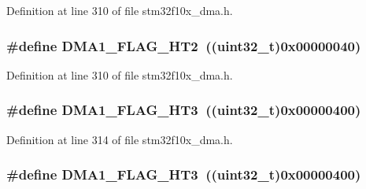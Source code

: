 Definition at line 310 of file stm32f10x\+\_\+dma.\+h.

\subsubsection[{\texorpdfstring{D\+M\+A1\+\_\+\+F\+L\+A\+G\+\_\+\+H\+T2}{DMA1_FLAG_HT2}}]{\setlength{\rightskip}{0pt plus 5cm}\#define D\+M\+A1\+\_\+\+F\+L\+A\+G\+\_\+\+H\+T2~(({\bf uint32\+\_\+t})0x00000040)}\hypertarget{group___d_m_a__flags__definition_gae154ffd90ebaec11f9ed1be00e69f149}{}\label{group___d_m_a__flags__definition_gae154ffd90ebaec11f9ed1be00e69f149}


Definition at line 310 of file stm32f10x\+\_\+dma.\+h.

\subsubsection[{\texorpdfstring{D\+M\+A1\+\_\+\+F\+L\+A\+G\+\_\+\+H\+T3}{DMA1_FLAG_HT3}}]{\setlength{\rightskip}{0pt plus 5cm}\#define D\+M\+A1\+\_\+\+F\+L\+A\+G\+\_\+\+H\+T3~(({\bf uint32\+\_\+t})0x00000400)}\hypertarget{group___d_m_a__flags__definition_ga9c801c1702fcc41b74bb7397ce80a8fc}{}\label{group___d_m_a__flags__definition_ga9c801c1702fcc41b74bb7397ce80a8fc}


Definition at line 314 of file stm32f10x\+\_\+dma.\+h.

\subsubsection[{\texorpdfstring{D\+M\+A1\+\_\+\+F\+L\+A\+G\+\_\+\+H\+T3}{DMA1_FLAG_HT3}}]{\setlength{\rightskip}{0pt plus 5cm}\#define D\+M\+A1\+\_\+\+F\+L\+A\+G\+\_\+\+H\+T3~(({\bf uint32\+\_\+t})0x00000400)}\hypertarget{group___d_m_a__flags__definition_ga9c801c1702fcc41b74bb7397ce80a8fc}{}\label{group___d_m_a__flags__definition_ga9c801c1702fcc41b74bb7397ce80a8fc}


